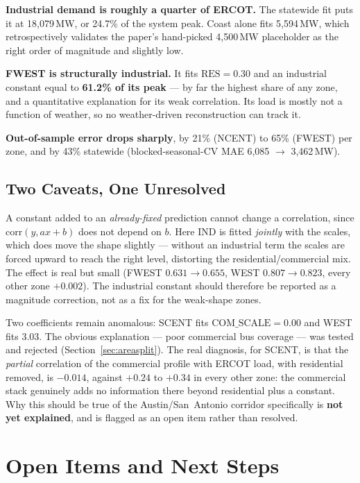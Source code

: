 \documentclass[11pt]{article}
\begin{document}
\textbf{Industrial demand is roughly a quarter of ERCOT.} The statewide fit puts it at
18{,}079\,MW, or 24.7\% of the system peak. Coast alone fits 5{,}594\,MW, which
retrospectively validates the paper's hand-picked 4{,}500\,MW placeholder as the right
order of magnitude and slightly low.

\textbf{FWEST is structurally industrial.} It fits $\mathrm{RES}=0.30$ and an industrial
constant equal to \textbf{61.2\% of its peak} --- by far the highest share of any zone, and
a quantitative explanation for its weak correlation. Its load is mostly not a function
of weather, so no weather-driven reconstruction can track it.

\textbf{Out-of-sample error drops sharply}, by 21\% (NCENT) to 65\% (FWEST) per zone,
and by 43\% statewide (blocked-seasonal-CV MAE 6{,}085 $\rightarrow$ 3{,}462\,MW).

\subsection{Two Caveats, One Unresolved}

A constant added to an \emph{already-fixed} prediction cannot change a correlation, since
$\mathrm{corr}(y, ax+b)$ does not depend on $b$. Here $\mathrm{IND}$ is fitted
\emph{jointly} with the scales, which does move the shape slightly --- without an
industrial term the scales are forced upward to reach the right level, distorting the
residential/commercial mix. The effect is real but small (FWEST $0.631\rightarrow0.655$,
WEST $0.807\rightarrow0.823$, every other zone $+0.002$). The industrial constant should
therefore be reported as a magnitude correction, not as a fix for the weak-shape zones.

Two coefficients remain anomalous: SCENT fits $\mathrm{COM\_SCALE}=0.00$ and WEST fits
3.03. The obvious explanation --- poor commercial bus coverage --- was tested and rejected
(Section~\ref{sec:areasplit}). The real diagnosis, for SCENT, is that the
\emph{partial} correlation of the commercial profile with ERCOT load, with residential
removed, is $-0.014$, against $+0.24$ to $+0.34$ in every other zone: the commercial
stack genuinely adds no information there beyond residential plus a constant. Why this
should be true of the Austin/San~Antonio corridor specifically is \textbf{not yet
explained}, and is flagged as an open item rather than resolved.

\section{Open Items and Next Steps}
\label{sec:nextsteps}
\end{document}
